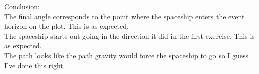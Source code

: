 \documentclass[12pt,norsk,a4paper]{article}
\begin{document}
\newpage
Conclusion:\\
The final angle corresponds to the point where the spaceship enters the event horizon on the plot. This is as expected.\\ 
The spaceship starts out going in the direction it did in the first exercise. This is as expected.\\
The path looks like the path gravity would force the spaceship to go so I guess I've done this right.\\
\end{document}
